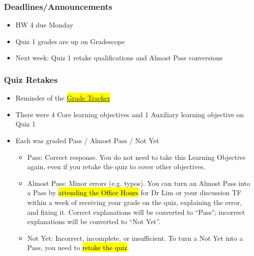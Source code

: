 
\begin{frame}
    \frametitle{Deadlines/Announcements}
\begin{itemize}
            \item HW 4 due Monday
            \item Quiz 1 grades are up on Gradescope
            \item Next week: Quiz 1 retake qualifications and Almost Pass conversions
        \end{itemize}
\end{frame}
\begin{frame}
    \frametitle{Quiz Retakes}
    \begin{itemize}
        \item Reminder of the \hl{\href{https://docs.google.com/spreadsheets/d/1hIntYsX7ILDrF5V_REz1IhdlLGSvDO0usUIGHq-kH94/edit?gid=0#gid=0}{Grade Tracker}}
        \item There were 4 Core learning objectives and 1 Auxiliary learning objective on Quiz 1
        \item Each was graded Pass / Almost Pass / Not Yet
        \begin{itemize}
            \item Pass: Correct response. You do not need to take this Learning Objective again, even if you retake the quiz to cover other objectives.
            \item Almost Pass: Minor errors (e.g. typos). You can turn an Almost Pass into a Pass by \hl{attending the Office Hours} for Dr Lim or your discussion TF within a week of receiving your grade on the quiz, explaining the error, and fixing it. Correct explanations will be converted to ``Pass"; incorrect explanations will be converted to ``Not Yet''.
            \item Not Yet: Incorrect, incomplete, or insufficient. To turn a Not Yet into a Pass, you need to \hl{retake the quiz}.
        \end{itemize}
    \end{itemize}
\end{frame}

